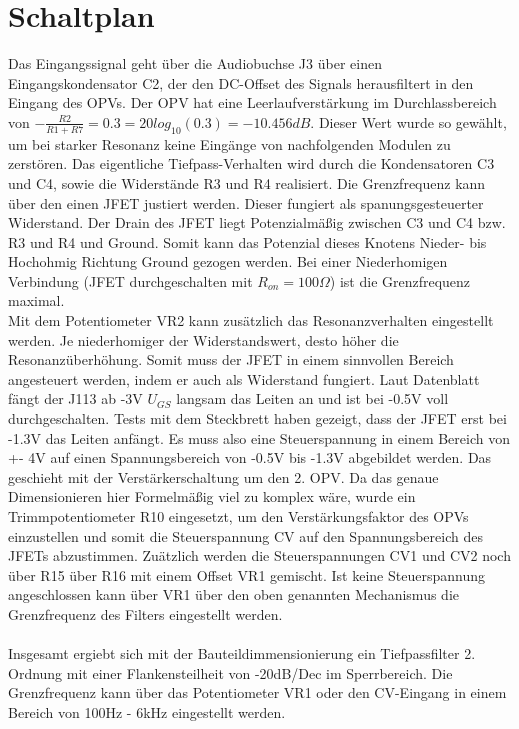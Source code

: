 \section{Schaltplan}
Das Eingangssignal geht über die Audiobuchse J3 über einen Eingangskondensator C2, der den DC-Offset des Signals herausfiltert in den Eingang des OPVs.
Der OPV hat eine Leerlaufverstärkung im Durchlassbereich von $-\frac{R2}{R1+R7} = 0.3 = 20 log_{10}(0.3) = -10.456 dB$. Dieser Wert wurde so gewählt,
um bei starker Resonanz keine Eingänge von nachfolgenden Modulen zu zerstören. Das eigentliche Tiefpass-Verhalten wird durch die Kondensatoren C3 und C4, sowie die Widerstände R3 und R4 realisiert. 
Die Grenzfrequenz kann über den einen JFET justiert werden. Dieser fungiert als spanungsgesteuerter Widerstand. Der Drain des JFET liegt Potenzialmäßig zwischen C3 und C4 bzw. R3 und R4 und Ground.
Somit kann das Potenzial dieses Knotens Nieder- bis Hochohmig Richtung Ground gezogen werden. Bei einer Niederhomigen Verbindung (JFET durchgeschalten mit $R_{on} = 100\Omega$) ist die Grenzfrequenz maximal.\\
Mit dem Potentiometer VR2 kann zusätzlich das Resonanzverhalten eingestellt werden. Je niederhomiger der Widerstandswert, desto höher die Resonanzüberhöhung.
Somit muss der JFET in einem sinnvollen Bereich angesteuert werden, indem er auch als Widerstand fungiert. Laut Datenblatt fängt der J113 ab -3V $U_{GS}$ langsam das Leiten an und ist bei -0.5V voll durchgeschalten.
Tests mit dem Steckbrett haben gezeigt, dass der JFET erst bei -1.3V das Leiten anfängt. Es muss also eine Steuerspannung in einem Bereich von +- 4V auf einen Spannungsbereich von -0.5V bis -1.3V abgebildet werden.
Das geschieht mit der Verstärkerschaltung um den 2. OPV. Da das genaue Dimensionieren hier Formelmäßig viel zu komplex wäre, wurde ein Trimmpotentiometer R10 eingesetzt, um den Verstärkungsfaktor des OPVs einzustellen
und somit die Steuerspannung CV auf den Spannungsbereich des JFETs abzustimmen.
Zuätzlich werden die Steuerspannungen CV1 und CV2 noch über R15 über R16 mit einem Offset VR1 gemischt.
Ist keine Steuerspannung angeschlossen kann über VR1 über den oben genannten Mechanismus die Grenzfrequenz des Filters eingestellt werden. \\
\\
Insgesamt ergiebt sich mit der Bauteildimmensionierung ein Tiefpassfilter 2. Ordnung mit einer Flankensteilheit von -20dB/Dec im Sperrbereich. Die Grenzfrequenz kann über das Potentiometer VR1 oder den CV-Eingang in einem Bereich von 100Hz - 6kHz eingestellt werden.

